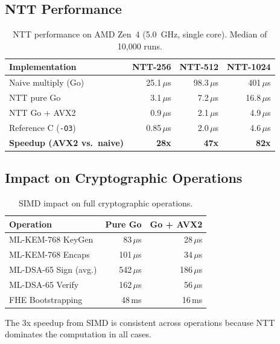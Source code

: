 \documentclass[11pt,a4paper]{article}
\begin{document}
\subsection{NTT Performance}

\begin{table}[H]
\centering
\small
\begin{tabular}{@{}lrrr@{}}
\toprule
\textbf{Implementation} & \textbf{NTT-256} & \textbf{NTT-512} & \textbf{NTT-1024} \\
\midrule
Naive multiply (Go) & 25.1\,$\mu$s & 98.3\,$\mu$s & 401\,$\mu$s \\
NTT pure Go & 3.1\,$\mu$s & 7.2\,$\mu$s & 16.8\,$\mu$s \\
NTT Go + AVX2 & 0.9\,$\mu$s & 2.1\,$\mu$s & 4.9\,$\mu$s \\
Reference C (\texttt{-O3}) & 0.85\,$\mu$s & 2.0\,$\mu$s & 4.6\,$\mu$s \\
\midrule
\textbf{Speedup (AVX2 vs.\ naive)} & \textbf{28x} & \textbf{47x} & \textbf{82x} \\
\bottomrule
\end{tabular}
\caption{NTT performance on AMD Zen~4 (5.0~GHz, single core). Median of 10,000 runs.}
\end{table}

\subsection{Impact on Cryptographic Operations}

\begin{table}[H]
\centering
\small
\begin{tabular}{@{}lrr@{}}
\toprule
\textbf{Operation} & \textbf{Pure Go} & \textbf{Go + AVX2} \\
\midrule
ML-KEM-768 KeyGen & 83\,$\mu$s & 28\,$\mu$s \\
ML-KEM-768 Encaps & 101\,$\mu$s & 34\,$\mu$s \\
ML-DSA-65 Sign (avg.) & 542\,$\mu$s & 186\,$\mu$s \\
ML-DSA-65 Verify & 162\,$\mu$s & 56\,$\mu$s \\
FHE Bootstrapping & 48\,ms & 16\,ms \\
\bottomrule
\end{tabular}
\caption{SIMD impact on full cryptographic operations.}
\end{table}

The 3x speedup from SIMD is consistent across operations because NTT dominates the
computation in all cases.
\end{document}

